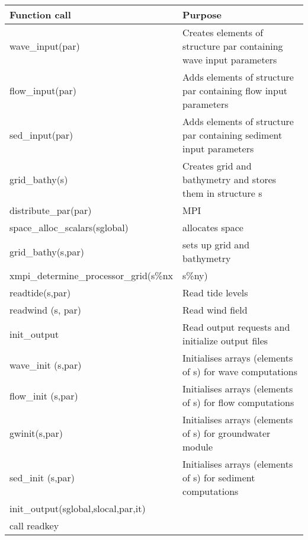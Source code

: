 \begin{tabular}{|p{1.7in}|p{2.2in}|} \hline 
Function call & Purpose \\ \hline 
wave\_input(par) & Creates elements of structure par containing wave input parameters \\ \hline 
flow\_input(par) & Adds elements of structure par containing flow input parameters \\ \hline 
sed\_input(par) & Adds elements of structure par containing sediment input parameters \\ \hline 
grid\_bathy(s) & Creates grid and bathymetry and stores them in structure s \\ \hline 
distribute\_par(par) & MPI \\ \hline 
space\_alloc\_scalars(sglobal) & allocates space \\ \hline 
grid\_bathy(s,par) & sets up grid and bathymetry \\ \hline 
xmpi\_determine\_processor\_grid(s\%nx & s\%ny) \\ \hline 
readtide(s,par) & Read tide levels \\ \hline 
readwind (s, par) & Read wind field \\ \hline 
init\_output & Read output requests and initialize output files \\ \hline 
wave\_init (s,par) & Initialises arrays (elements of s) for wave computations \\ \hline 
flow\_init (s,par) & Initialises arrays (elements of s) for flow computations \\ \hline 
gwinit(s,par) & Initialises arrays (elements of s) for groundwater module \\ \hline 
sed\_init (s,par) & Initialises arrays (elements of s) for sediment computations \\ \hline 
init\_output(sglobal,slocal,par,it) &  \\ \hline 
call readkey &  \\ \hline 
\end{tabular}

\eject 

